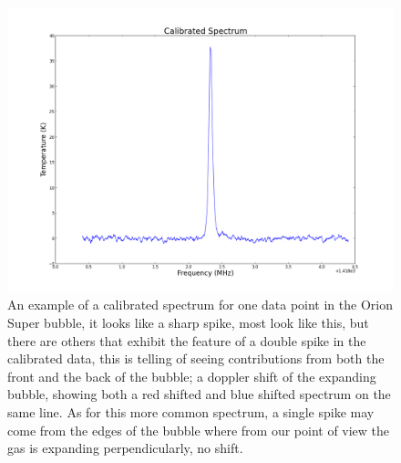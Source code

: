 \documentclass[12 pt]{article}
\begin{document}
\begin{figure}[H]
\centering
\includegraphics[scale=0.45]{calibspect.png}
\caption{An example of a calibrated spectrum for one data point in the
  Orion Super bubble, it looks like a sharp spike, most look like this,
  but there are others that exhibit the feature of a double spike in the
  calibrated data, this is telling of seeing contributions from both the
  front and the back of the bubble; a doppler shift of the expanding
  bubble, showing both a red shifted and blue shifted spectrum on the
  same line. As for this more common spectrum, a single spike may come
  from the edges of the bubble where from our point of view the gas is
  expanding perpendicularly, no shift.}
\label{calibspect}
\end{figure} 
\end{document}
